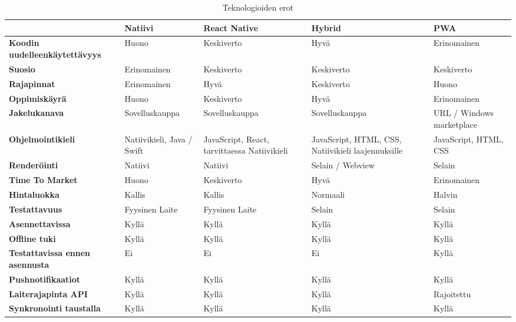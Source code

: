 \documentclass{tktltiki}
\begin{document}
\begin{landscape}
\begin{table}[!ht]
\centering
\begin{small}
\caption{ Teknologioiden erot \cite{biorn2017progressive} }
\begin{tabular}{|L{4cm}|L{4cm}|L{4cm}|L{4cm}| L{4cm}|}
\hline
\textbf{} &
\textbf{Natiivi} & 
\textbf{React Native} &
\textbf{Hybrid} & 
\textbf{PWA}
\\ \hline
\textbf{Koodin uudelleenkäytettävyys} & Huono &	Keskiverto & Hyvä & Erinomainen
\\ \hline
\textbf{Suosio} & Erinomainen & Keskiverto & Keskiverto & Keskiverto
\\ \hline
\textbf{Rajapinnat} & Erinomainen &	Hyvä & Keskiverto &	Huono
\\ \hline
\textbf{Oppimiskäyrä} & Huono &	Keskiverto & Hyvä &	Erinomainen
\\ \hline
\textbf{Jakelukanava} & Sovelluskauppa & Sovelluskauppa & Sovelluskauppa & URL / Windows marketplace
\\ \hline
\textbf{Ohjelmointikieli} & Natiivikieli, Java / Swift & JavaScript, React, tarvittaessa Natiivikieli &	JavaScript, HTML, CSS, Natiivikieli laajennuksille & JavaScript, HTML, CSS
\\ \hline
\textbf{Renderöinti} & Natiivi & Natiivi & Selain / Webview & Selain
\\ \hline
\textbf{Time To Market} & Huono	& Keskiverto & Hyvä & Erinomainen
\\ \hline
\textbf{Hintaluokka} & Kallis &	Kallis & Normaali &	Halvin
\\ \hline
\textbf{Testattavuus} & Fyysinen Laite & Fyysinen Laite & Selain & Selain
\\ \hline
\textbf{Asennettavissa} & Kyllä & Kyllä & Kyllä & Kyllä
\\ \hline
\textbf{Offline tuki} & Kyllä & Kyllä & Kyllä & Kyllä
\\ \hline
\textbf{Testattavissa ennen asennusta} & Ei & Ei & Ei & Kyllä
\\ \hline
\textbf{Pushnotifikaatiot} & Kyllä & Kyllä & Kyllä & Kyllä
\\ \hline
\textbf{Laiterajapinta API} & Kyllä & Kyllä & Kyllä & Rajoitettu
\\ \hline
\textbf{Synkronointi taustalla} & Kyllä & Kyllä & Kyllä & Kyllä
\\ \hline
\end{tabular}
\label{table:teknologiaerot}
\end{small}
\end{table}

\end{landscape}
\end{document}
